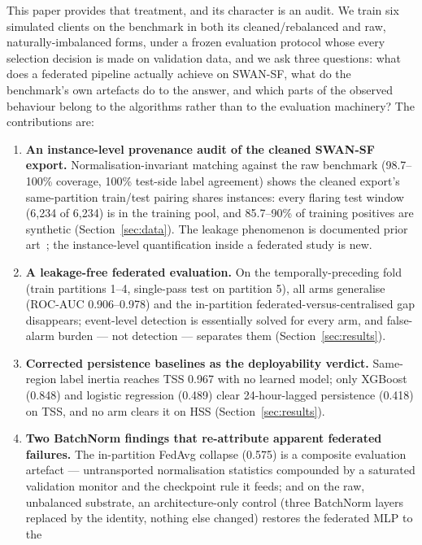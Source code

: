 This paper provides that treatment, and its character is an audit.
We train six simulated clients on the benchmark in both its
cleaned/rebalanced and raw, naturally-imbalanced forms, under a
frozen evaluation protocol whose every selection decision is made on
validation data, and we ask three questions: what does a federated
pipeline actually achieve on SWAN-SF, what do the benchmark's own
artefacts do to the answer, and which parts of the observed behaviour
belong to the algorithms rather than to the evaluation machinery?
The contributions are:

\begin{enumerate}[leftmargin=2em, itemsep=3pt]
  \item \textbf{An instance-level provenance audit of the cleaned
  SWAN-SF export.} Normalisation-invariant matching against the raw
  benchmark (98.7--100\% coverage, 100\% test-side label agreement)
  shows the cleaned export's same-partition train/test pairing
  shares instances: every flaring test window (6{,}234 of 6{,}234) is
  in the training pool, and 85.7--90\% of training positives are
  synthetic (Section~\ref{sec:data}). The leakage phenomenon is
  documented prior art~\cite{angryk2019,eskandari2024}; the
  instance-level quantification inside a federated study is new.
  \item \textbf{A leakage-free federated evaluation.} On the
  temporally-preceding fold (train partitions 1--4, single-pass test
  on partition 5), all arms generalise (ROC-AUC 0.906--0.978) and the
  in-partition federated-versus-centralised gap disappears; event-level
  detection is essentially solved for every arm, and false-alarm
  burden --- not detection --- separates them
  (Section~\ref{sec:results}).
  \item \textbf{Corrected persistence baselines as the deployability
  verdict.} Same-region label inertia reaches TSS 0.967 with no
  learned model; only XGBoost (0.848) and logistic regression
  (0.489) clear 24-hour-lagged persistence (0.418) on TSS, and no arm
  clears it on HSS (Section~\ref{sec:results}).
  \item \textbf{Two BatchNorm findings that re-attribute apparent
  federated failures.} The in-partition FedAvg collapse (0.575) is a
  composite evaluation artefact --- untransported normalisation
  statistics compounded by a saturated validation monitor and the
  checkpoint rule it feeds; and on the raw, unbalanced substrate, an
  architecture-only control (three BatchNorm layers replaced by the
  identity, nothing else changed) restores the federated MLP to the

\end{enumerate}
